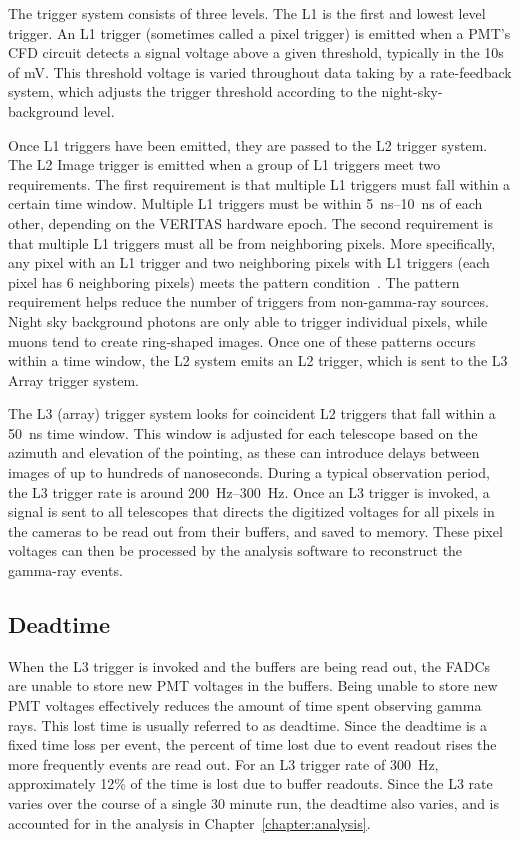 The trigger system consists of three levels.
The L1 is the first and lowest level trigger.
An L1 trigger (sometimes called a pixel trigger) is emitted when a PMT's CFD circuit detects a signal voltage above a given threshold, typically in the 10s of mV.
This threshold voltage is varied throughout data taking by a rate-feedback system, which adjusts the trigger threshold according to the night-sky-background level.

Once L1 triggers have been emitted, they are passed to the L2 trigger system.
The L2 Image trigger is emitted when a group of L1 triggers meet two requirements.
The first requirement is that multiple L1 triggers must fall within a certain time window.
Multiple L1 triggers must be within \SIrange{5}{10}{ns} of each other, depending on the VERITAS hardware epoch.
The second requirement is that multiple L1 triggers must all be from neighboring pixels.
More specifically, any pixel with an L1 trigger and two neighboring pixels with L1 triggers (each pixel has 6 neighboring pixels) meets the pattern condition~\cite{veritas_v6_trigger}.
The pattern requirement helps reduce the number of triggers from non-gamma-ray sources.
Night sky background photons are only able to trigger individual pixels, while muons tend to create ring-shaped images.
Once one of these patterns occurs within a time window, the L2 system emits an L2 trigger, which is sent to the L3 Array trigger system.

The L3 (array) trigger system looks for coincident L2 triggers that fall within a \nicetilde\SI{50}{ns} time window.
This window is adjusted for each telescope based on the azimuth and elevation of the pointing, as these can introduce delays between images of up to hundreds of nanoseconds.
During a typical observation period, the L3 trigger rate is around \SIrange{200}{300}{Hz}.
Once an L3 trigger is invoked, a signal is sent to all telescopes that directs the digitized voltages for all pixels in the cameras to be read out from their buffers, and saved to memory.
These pixel voltages can then be processed by the analysis software to reconstruct the gamma-ray events.



\subsection{Deadtime}
When the L3 trigger is invoked and the buffers are being read out, the FADCs are unable to store new PMT voltages in the buffers.
Being unable to store new PMT voltages effectively reduces the amount of time spent observing gamma rays.
This lost time is usually referred to as deadtime.
Since the deadtime is a fixed time loss per event, the percent of time lost due to event readout rises the more frequently events are read out.
For an L3 trigger rate of \nicetilde{}\SI{300}{Hz}, approximately 12\% of the time is lost due to buffer readouts.
Since the L3 rate varies over the course of a single 30 minute run, the deadtime also varies, and is accounted for in the analysis in Chapter~\ref{chapter:analysis}.

